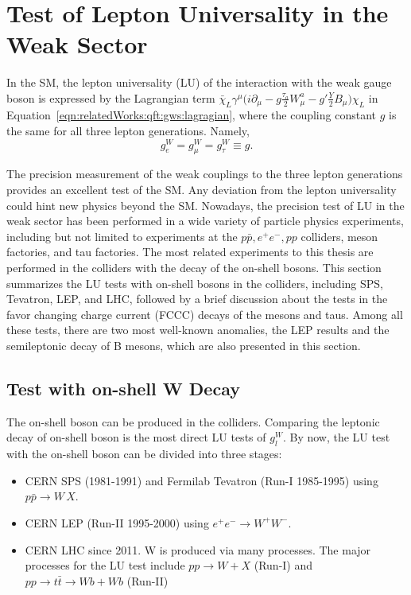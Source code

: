 
\section{Test of Lepton Universality in the Weak Sector}
\label{sec:relatedWorks:lu}

In the SM, the lepton universality (LU) of the interaction with the weak gauge boson is expressed by the Lagrangian term $\bar{\chi}_L \gamma^\mu \big( i \partial_\mu -g \frac{\tau_a}{2} W^a_\mu -g'\frac{Y}{2} B_\mu \big) \chi_L $ in Equation~\ref{eqn:relatedWorks:qft:gws:lagragian}, where the coupling constant $g$ is the same for all three lepton generations. Namely,
\begin{equation}
	g_e^W = g_\mu^W = g_\tau^W \equiv g.
\end{equation}

\noindent The precision measurement of the weak couplings to the three lepton generations provides an excellent test of the SM. Any deviation from the lepton universality could hint new physics beyond the SM. Nowadays, the precision test of LU in the weak sector has been performed in a wide variety of particle physics experiments, including but not limited to experiments at the $p\bar{p}, e^+ e^-, pp$ colliders, meson factories, and tau factories. The most related experiments to this thesis are performed in the colliders with the decay of the on-shell \PW bosons. This section summarizes the LU tests with on-shell \PW bosons in the colliders, including SPS, Tevatron, LEP, and LHC, followed by a brief discussion about the tests in the favor changing charge current (FCCC) decays of the mesons and taus. Among all these tests, there are two most well-known anomalies, the LEP results and the semileptonic decay of B mesons, which are also presented in this section. 


\subsection{Test with on-shell W Decay}
\label{sec:relatedWorks:lu:W}


The on-shell \PW boson can be produced in the colliders. Comparing the leptonic decay of on-shell \PW boson is the most direct LU tests of $g^W_l$. By now, the LU test with the on-shell \PW boson can be divided into three stages:

\begin{itemize}
    \item CERN SPS (1981-1991) and Fermilab Tevatron (Run-I 1985-1995) using \mbox{$p \bar{p} \to W \, X$}.
    \item CERN LEP (Run-II 1995-2000) using $e^+e^- \to W^+  W^-$.
    \item CERN LHC since 2011. W is produced via many processes. The major processes for the LU test include $pp \to W +X$ (Run-I) and $pp \to t \bar{t} \to Wb+Wb$ (Run-II)
\end{itemize}

